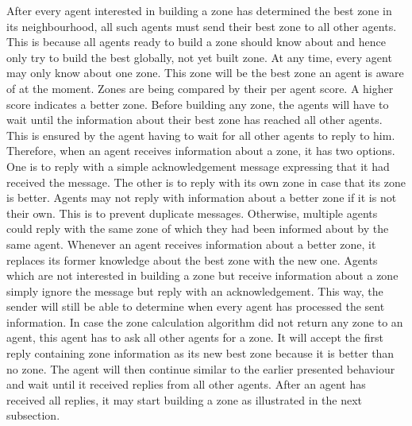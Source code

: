 After every agent interested in building a zone has determined the best zone in its neighbourhood, all such agents must send their best zone to all other agents. This is because all agents ready to build a zone should know about and hence only try to build the best globally, not yet built zone. At any time, every agent may only know about one zone. This zone will be the best zone an agent is aware of at the moment. Zones are being compared by their per agent score. A higher score indicates a better zone. Before building any zone, the agents will have to wait until the information about their best zone has reached all other agents. This is ensured by the agent having to wait for all other agents to reply to him. Therefore, when an agent receives information about a zone, it has two options. One is to reply with a simple acknowledgement message expressing that it had received the message. The other is to reply with its own zone in case that its zone is better. Agents may not reply with information about a better zone if it is not their own. This is to prevent duplicate messages. Otherwise, multiple agents could reply with the same zone of which they had been informed about by the same agent. Whenever an agent receives information about a better zone, it replaces its former knowledge about the best zone with the new one. Agents which are not interested in building a zone but receive information about a zone simply ignore the message but reply with an acknowledgement. This way, the sender will still be able to determine when every agent has processed the sent information. In case the zone calculation algorithm did not return any zone to an agent, this agent has to ask all other agents for a zone. It will accept the first reply containing zone information as its new best zone because it is better than no zone. The agent will then continue similar to the earlier presented behaviour and wait until it received replies from all other agents. After an agent has received all replies, it may start building a zone as illustrated in the next subsection. %
